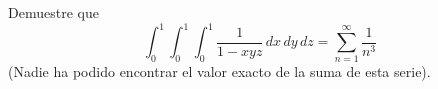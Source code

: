 \item Demuestre que
    \[ \int_0^1 \int_0^1 \int_0^1 \frac{1}{1 - xyz} \, dx \, dy \, dz = \sum_{n=1}^\infty \frac{1}{n^3} \]
    (Nadie ha podido encontrar el valor exacto de la suma de esta serie).
